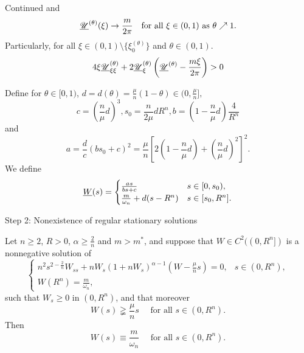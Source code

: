 \begin{frame}

\begin{block}{Continued}
	and
	\begin{equation}\label{eq:uut pp converges to m/2pi}
		\underline{\mathscr U}^{(\theta)} (\xi) \rightarrow \frac{m}{2\pi} \quad\text{for all } \xi\in(0, 1) \text{ as } \theta\nearrow 1.
	\end{equation}
	Particularly, for all  $\xi\in (0, 1)\setminus \{ \xi_0^{(\theta)}\}$ and $\theta\in(0,1)$.
	\begin{equation}\label{eq:stationary subsolution inequality}
		4\xi\underline{\mathscr U}^{(\theta)}_{\xi\xi} + 2\underline{\mathscr U}^{(\theta)}_\xi\left(\underline{\mathscr U}^{(\theta)} -\frac{m\xi}{2\pi}\right) > 0
	\end{equation}
\end{block}

Define for $\theta\in[0,1)$, $d=d(\theta)=\frac\mu{n}(1-\theta)\in(0,\frac\mu{n}],$
	\begin{equation}\label{parameter c b s}
	c = \left(\frac{n}{\mu}d\right)^3, s_0 = \frac{n}{2\mu}dR^n, b = \left(1 - \frac{n}{\mu}d\right)\frac4{R^n}
	\end{equation}
	 and
	\begin{equation}\label{parameter a}
		a= \frac{d}{c}(bs_0 + c)^2 = \frac{\mu}{n}\left[2\left(1-\frac{n}{\mu}d\right) + \left(\frac{n}{\mu}d\right)^2\right]^2.
	\end{equation}
	We define
	\begin{equation}\label{subsolution with parameter}
		\underline{W}(s) = 
		\begin{cases}
			\frac{as}{bs + c} & s\in[0, s_0),\\
			\frac{m}{\omega_n} + d(s - R^n) & s\in[s_0, R^n].\\
		\end{cases}
	\end{equation}

\end{frame}

\begin{frame}{Step 2: Nonexistence of regular stationary solutions}
\begin{lemma}\label{constant stationary solution}
	Let $n\geqslant2$, $R>0$, $\alpha\geqslant\frac2n$ and $m>m^*$, and suppose that $W\in C^2((0, R^n])$ is a nonnegative solution of 
\begin{equation}
	\label{one-point boundary value problem}
	\begin{cases}
		n^2s^{2-\frac2n}W_{ss} + nW_s(1 + nW_s)^{\alpha -1}\left(W - \frac{\mu}{n}s\right) = 0,& s\in(0,R^n),\\
		W(R^n) = \frac{m}{\omega_n}, &
	\end{cases}
\end{equation}
 such that $W_s\geqslant 0$ in $(0, R^n)$, and that moreover
	\begin{equation}\nonumber
		W(s)\gneqq\frac{\mu}{n}s \quad \text{ for all } s\in(0, R^n).
	\end{equation}
Then
	\begin{equation}\nonumber
		W(s) \equiv \frac m{\omega_n}\quad \text{ for all } s\in(0, R^n).
	\end{equation}
\end{lemma}
\end{frame}

